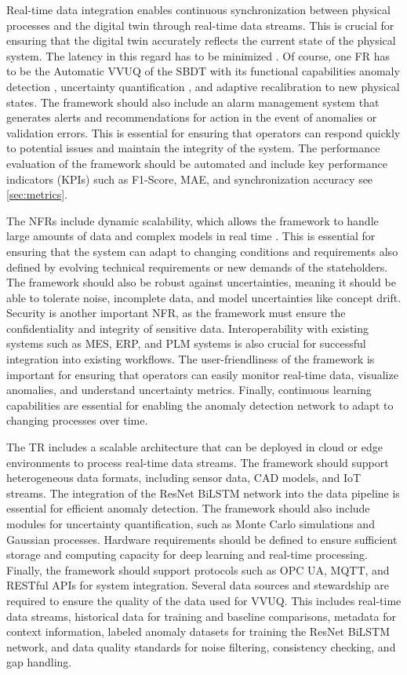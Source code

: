 Real-time data integration enables continuous synchronization between physical processes and the digital twin through real-time data streams. This is crucial for ensuring that the digital twin accurately reflects the current state of the physical system. The latency in this regard has to be minimized \autocite{li2018learning}. Of course, one FR has to be the Automatic VVUQ of the SBDT with its functional capabilities anomaly detection \autocite{pang2021deep}, uncertainty quantification \autocite{sel2025survey}, and adaptive recalibration to new physical states. The framework should also include an alarm management system that generates alerts and recommendations for action in the event of anomalies or validation errors. This is essential for ensuring that operators can respond quickly to potential issues and maintain the integrity of the system. The performance evaluation of the framework should be automated and include key performance indicators (KPIs) such as F1-Score, MAE, and synchronization accuracy see \autoref{sec:metrics}.

The NFRs include dynamic scalability, which allows the framework to handle large amounts of data and complex models in real time \autocite{leskovec2020mining}. This is essential for ensuring that the system can adapt to changing conditions and requirements also defined by evolving technical requirements or new demands of the stateholders. The framework should also be robust against uncertainties, meaning it should be able to tolerate noise, incomplete data, and model uncertainties like concept drift. Security is another important NFR, as the framework must ensure the confidentiality and integrity of sensitive data. Interoperability with existing systems such as MES, ERP, and PLM systems is also crucial for successful integration into existing workflows. The user-friendliness of the framework is important for ensuring that operators can easily monitor real-time data, visualize anomalies, and understand uncertainty metrics. Finally, continuous learning capabilities are essential for enabling the anomaly detection network to adapt to changing processes over time.

The TR includes a scalable architecture that can be deployed in cloud or edge environments to process real-time data streams. The framework should support heterogeneous data formats, including sensor data, CAD models, and IoT streams. The integration of the ResNet BiLSTM network into the data pipeline is essential for efficient anomaly detection. The framework should also include modules for uncertainty quantification, such as Monte Carlo simulations and Gaussian processes. Hardware requirements should be defined to ensure sufficient storage and computing capacity for deep learning and real-time processing. Finally, the framework should support protocols such as OPC UA, MQTT, and RESTful APIs for system integration. Several data sources and stewardship are required to ensure the quality of the data used for VVUQ. This includes real-time data streams, historical data for training and baseline comparisons, metadata for context information, labeled anomaly datasets for training the ResNet BiLSTM network, and data quality standards for noise filtering, consistency checking, and gap handling.

